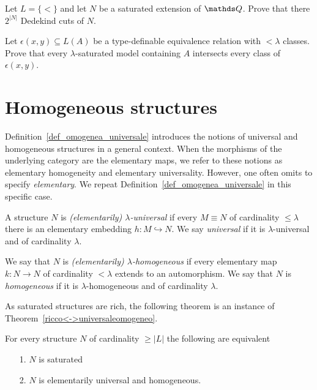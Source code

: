\begin{exercise}
  Let $L = \{<\}$ and let $N$ be a saturated extension of $\QQ$.
  Prove that there $2^{|N|}$ Dedekind cuts of $N$.
\end{exercise}

\begin{exercise}
  Let $\epsilon(x,y)\subseteq L(A)$ be a type-definable equivalence relation with $<\lambda$ classes.
  Prove that every $\lambda$-saturated model containing $A$ intersects every class of $\epsilon(x,y)$.
\end{exercise}

\section{Homogeneous structures}\label{homogeneous}
Definition~\ref{def_omogenea_universale} introduces the notions of universal and homogeneous structures in a general context.
When the morphisms of the underlying category are the elementary maps, we refer to these notions as elementary homogeneity and elementary universality.
However, one often omits to specify \textit{elementary}. We repeat Definition~\ref{def_omogenea_universale} in this specific case. 

\begin{definition}
A structure $N$ is \emph{(elementarily) $\lambda$-universal\/} if every $M\equiv N$ of cardinality $\le\lambda$ there is an elementary embedding $h:M\hookrightarrow N$.
We say  \emph{universal\/}  if it is $\lambda$-universal and of cardinality $\lambda$.

We say that $N$ is \emph{(elementarily) $\lambda$-homogeneous\/} if every elementary map $k:N\to N$ of cardinality $<\lambda$ extends to an automorphism. We say that $N$ is \emph{homogeneous\/} if it is $\lambda$-homogeneous and of cardinality $\lambda$.
\end{definition}

As saturated structures are rich, the following theorem is an instance of Theorem~\ref{ricco<->universaleomogeneo}.

\begin{theorem}\label{thm_saturo_omogeneouniversale}
For every structure $N$ of cardinality $\ge|L|$ the following are equivalent\nobreak
\begin{itemize}
\item[1.] $N$ is saturated
\item[2.] $N$ is elementarily universal and homogeneous.
\end{itemize}
\end{theorem}

